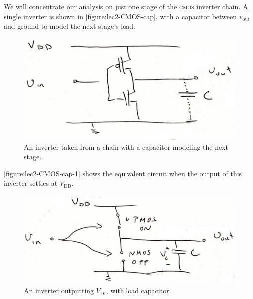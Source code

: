 We will concentrate our analysis on just one stage of the \textsc{cmos} inverter chain.
A single inverter is shown in \autoref{figure:lec2-CMOS-cap},
with a capacitor between \(v_\text{out}\) and ground to model the
next stage's load.
\begin{figure}
  \centering
  \includegraphics[width=0.75\linewidth]{figures/CMOS-inverter-with-out-cap}
  \caption{An inverter taken from a chain with a capacitor modeling the next stage.}
  \label{figure:lec2-CMOS-cap}
\end{figure}
\autoref{figure:lec2-CMOS-cap-1} shows the equivalent circuit when the output of this inverter settles at \(V_\text{DD}\).
\begin{figure}
  \centering
  \includegraphics[width=0.75\linewidth]{figures/CMOS-cap-1}
  \caption{An inverter outputting \(V_\text{DD}\) with load capacitor.}
  \label{figure:lec2-CMOS-cap-1}
\end{figure}

